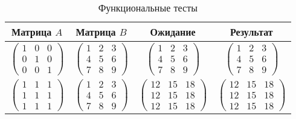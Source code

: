 \begin{center}
    \captionsetup{justification=raggedright,singlelinecheck=off}
    \begin{longtable}[c]{|c|c|c|c|}
    \caption{Функциональные тесты\label{tbl:functional_test}} \\ \hline
		Матрица $A$ & Матрица $B$ & Ожидание & Результат \\ \hline
		$\begin{pmatrix}1 & 0 & 0 \\
						0 & 1 & 0 \\
						0 & 0 & 1 \end{pmatrix}$ & 
		$\begin{pmatrix}1 & 2 & 3 \\
						4 & 5 & 6 \\
						7 & 8 & 9 \end{pmatrix}$ & 
		$\begin{pmatrix}1 & 2 & 3 \\
						4 & 5 & 6 \\
						7 & 8 & 9 \end{pmatrix}$ &  
		$\begin{pmatrix}1 & 2 & 3 \\
						4 & 5 & 6 \\
						7 & 8 & 9 \end{pmatrix}$					
						\\ \hline

		$\begin{pmatrix}1 & 1 & 1 \\
						1 & 1 & 1 \\
						1 & 1 & 1 \end{pmatrix}$ & 
		$\begin{pmatrix}1 & 2 & 3 \\
						4 & 5 & 6 \\
						7 & 8 & 9 \end{pmatrix}$ &
		$\begin{pmatrix}12 & 15 & 18 \\
						12 & 15 & 18 \\
						12 & 15 & 18 \end{pmatrix}$ &
		$\begin{pmatrix}12 & 15 & 18 \\
						12 & 15 & 18 \\
						12 & 15 & 18 \end{pmatrix}$					
						\\ \hline


\end{longtable}
\end{center}
